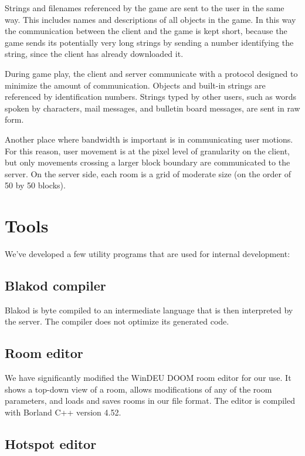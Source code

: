 \documentclass[12pt]{article}
\begin{document}
Strings and filenames referenced by the game are sent to the user in
the same way.  This includes names and descriptions of all objects in
the game.  In this way the communication between the client and the
game is kept short, because the game sends its potentially very long
strings by sending a number identifying the string, since the client
has already downloaded it.

During game play, the client and server communicate with a protocol
designed to minimize the amount of communication.  Objects and
built-in strings are referenced by identification numbers.  Strings
typed by other users, such as words spoken by characters, mail
messages, and bulletin board messages, are sent in raw form.

Another place where bandwidth is important is in communicating user
motions.  For this reason, user movement is at the pixel level of
granularity on the client, but only movements crossing a larger block
boundary are communicated to the server.  On the server side, each
room is a grid of moderate size (on the order of 50 by 50 blocks).


\section{Tools}

We've developed a few utility programs that are used for internal
development:

\subsection{Blakod compiler}

Blakod is byte compiled to an intermediate language that is then
interpreted by the server.  The compiler does not optimize its
generated code.

\subsection{Room editor}

We have significantly modified the WinDEU DOOM room editor for our
use.  It shows a top-down view of a room, allows modifications of any
of the room parameters, and loads and saves rooms in our file format.
The editor is compiled with Borland C++ version 4.52.

\subsection{Hotspot editor}
\end{document}
